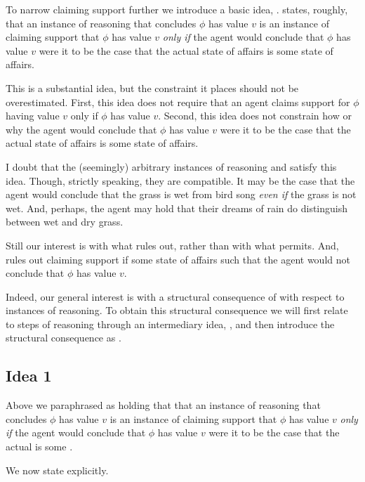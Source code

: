 \begin{note}
  To narrow claiming support further we introduce a basic idea, \ideaCSA{}.
  \ideaCSA{} states, roughly, that an instance of reasoning that concludes \(\phi\) has value \(v\) is an instance of claiming support that \(\phi\) has value \(v\) \emph{only if} the agent would conclude that \(\phi\) has value \(v\) were it to be the case that the actual state of affairs is some \ep{} state of affairs.

  This is a substantial idea, but the constraint it places should not be overestimated.
  First, this idea does not require that an agent claims support for \(\phi\) having value \(v\) only if \(\phi\) has value \(v\).
  Second, this idea does not constrain how or why the agent would conclude that \(\phi\) has value \(v\) were it to be the case that the actual state of affairs is some \ep{} state of affairs.

  I doubt that the (seemingly) arbitrary instances of reasoning \label{ex:assu:CSVP:lim:1} and \label{ex:assu:CSVP:lim:1} satisfy this idea.
  Though, strictly speaking, they are compatible.
  It may be the case that the agent would conclude that the grass is wet from bird song \emph{even if} the grass is not wet.
  And, perhaps, the agent may hold that their dreams of rain do distinguish between wet and dry grass.

  Still our interest is with what \ideaCSA{} rules out, rather than with what \ideaCSA{} permits.
  And, \ideaCSA{} rules out claiming support if some \ep{} state of affairs such that the agent would not conclude that \(\phi\) has value \(v\).

  Indeed, our general interest is with a structural consequence of \ideaCSA{} with respect to instances of reasoning.
  To obtain this structural consequence we will first relate \ideaCSA{} to steps of reasoning through an intermediary idea, \ideaCSB{}, and then introduce the structural consequence as \ideaCSB{}.
\end{note}

\subsection{Idea 1}
\label{sec:idea-1}

\begin{note}
  Above we paraphrased \ideaCSA{} as holding that that an instance of reasoning that concludes \(\phi\) has value \(v\) is an instance of claiming support that \(\phi\) has value \(v\) \emph{only if} the agent would conclude that \(\phi\) has value \(v\) were it to be the case that the actual \world{} is some \ep{} \world{}.

  We now state \ideaCSA{} explicitly.
\end{note}

